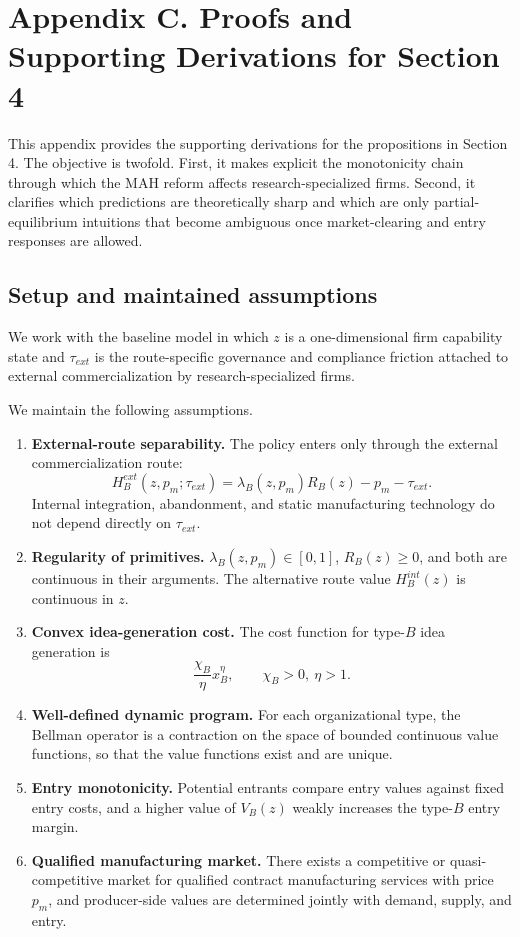 \documentclass[12pt]{article}
\begin{document}
\appendix
\section{Appendix C. Proofs and Supporting Derivations for Section 4}

This appendix provides the supporting derivations for the propositions in Section 4. The objective is twofold. First, it makes explicit the monotonicity chain through which the MAH reform affects research-specialized firms. Second, it clarifies which predictions are theoretically sharp and which are only partial-equilibrium intuitions that become ambiguous once market-clearing and entry responses are allowed.

\subsection{Setup and maintained assumptions}

We work with the baseline model in which \(z\) is a one-dimensional firm capability state and \(\tau_{ext}\) is the route-specific governance and compliance friction attached to external commercialization by research-specialized firms.

We maintain the following assumptions.

\begin{enumerate}[label=\textbf{A\arabic*},leftmargin=2.4em]
    \item \textbf{External-route separability.}
    The policy enters only through the external commercialization route:
    \[
    H_B^{ext}(z,p_m;\tau_{ext})
    =
    \lambda_B(z,p_m)R_B(z)-p_m-\tau_{ext}.
    \]
    Internal integration, abandonment, and static manufacturing technology do not depend directly on \(\tau_{ext}\).

    \item \textbf{Regularity of primitives.}
    \(\lambda_B(z,p_m)\in[0,1]\), \(R_B(z)\ge 0\), and both are continuous in their arguments. The alternative route value \(H_B^{int}(z)\) is continuous in \(z\).

    \item \textbf{Convex idea-generation cost.}
    The cost function for type-\(B\) idea generation is
    \[
    \frac{\chi_B}{\eta}x_B^\eta,
    \qquad \chi_B>0,\ \eta>1.
    \]

    \item \textbf{Well-defined dynamic program.}
    For each organizational type, the Bellman operator is a contraction on the space of bounded continuous value functions, so that the value functions exist and are unique.

    \item \textbf{Entry monotonicity.}
    Potential entrants compare entry values against fixed entry costs, and a higher value of \(V_B(z)\) weakly increases the type-\(B\) entry margin.

    \item \textbf{Qualified manufacturing market.}
    There exists a competitive or quasi-competitive market for qualified contract manufacturing services with price \(p_m\), and producer-side values are determined jointly with demand, supply, and entry.
\end{enumerate}
\end{document}
